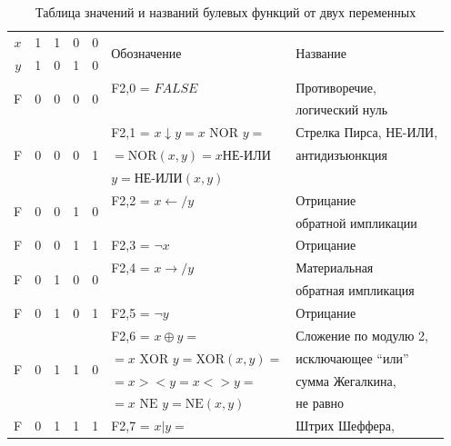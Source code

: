 \begin{table}[!h]
\centering
\caption{Таблица значений и названий булевых функций от двух переменных}
\small %
\begin{tabular}{|c|c|c|c|c|p{4.5cm}|p{4.5cm}|} %
\hline
$x$ & 1 & 1 & 0 & 0 & \multirow{2}{*}{Обозначение} & \multirow{2}{*}{Название} \\
$y$ & 1 & 0 & 1 & 0 & & \\
\hline
\multirow{2}{*}{F} & \multirow{2}{*}{0} & \multirow{2}{*}{0} & \multirow{2}{*}{0} & \multirow{2}{*}{0} & F2,0 = $FALSE$ & Противоречие, \\
& & & & & & логический нуль \\
\hline
\multirow{3}{*}{F} & \multirow{3}{*}{0} & \multirow{3}{*}{0} & \multirow{3}{*}{0} & \multirow{3}{*}{1} & F2,1 = $x\downarrow y = x \text{ NOR } y = $ & Стрелка Пирса, НЕ-ИЛИ, \\
& & & & & $= \text{NOR}(x,y) = x $НЕ-ИЛИ & антидизъюнкция \\
& & & & & $y = $НЕ-ИЛИ$(x,y)$ & \\
\hline
\multirow{2}{*}{F} & \multirow{2}{*}{0} & \multirow{2}{*}{0} & \multirow{2}{*}{1} & \multirow{2}{*}{0} & F2,2 = $x\leftarrow /y$ & Отрицание \\
& & & & & & обратной импликации \\
\hline
F & 0 & 0 & 1 & 1 & F2,3 = $\neg x $ & Отрицание \\
\hline
\multirow{2}{*}{F} & \multirow{2}{*}{0} & \multirow{2}{*}{1} & \multirow{2}{*}{0} & \multirow{2}{*}{0} & F2,4 = $x\rightarrow /y $ & Материальная \\
& & & & & & обратная импликация \\
\hline
F & 0 & 1 & 0 & 1 & F2,5 = $ \neg y$ & Отрицание \\
\hline
\multirow{4}{*}{F} & \multirow{4}{*}{0} & \multirow{4}{*}{1} & \multirow{4}{*}{1} & \multirow{4}{*}{0} & F2,6 = $x \oplus y = $ & Сложение по модулю 2, \\
& & & & & $= x \text{ XOR } y = \text{XOR}(x,y) = $ & исключающее \enquote{или} \\
& & & & & $= x >< y = x <> y = $ & сумма Жегалкина, \\
& & & & & $= x \text{ NE } y = \text{NE}(x,y)$ & не равно \\
\hline
\multirow{3}{*}{F} & \multirow{3}{*}{0} & \multirow{3}{*}{1} & \multirow{3}{*}{1} & \multirow{3}{*}{1} & F2,7 = $x | y = $ & Штрих Шеффера, \\

\end{tabular}
\end{table}
